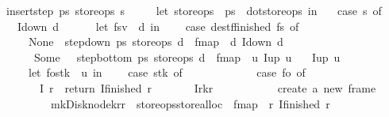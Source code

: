\begin{isabellebody}
{\isachardoublequoteopen}insert{\isacharunderscore}step\ ps{}\ store{\isacharunderscore}ops\ s\ {\isacharequal}\ {\isacharparenleft}\isanewline
\ \ {\isacharparenleft}{\isacharasterisk}\ let\ store{\isacharunderscore}ops\ {\isacharequal}\ ps{}\ {\isacharbar}{\isachargreater}\ dot{\isacharunderscore}store{\isacharunderscore}ops\ in\ {\isacharasterisk}{\isacharparenright}\isanewline
\ \ case\ s\ of\ \isanewline
\ \ I{\isacharunderscore}down\ d\ {\isasymRightarrow}\ {\isacharparenleft}\isanewline
\ \ \ \ let\ {\isacharparenleft}fs{\isacharcomma}v{\isacharparenright}\ {\isacharequal}\ d\ in\isanewline
\ \ \ \ case\ {\isacharparenleft}dest{\isacharunderscore}f{\isacharunderscore}finished\ fs{\isacharparenright}\ of\ \isanewline
\ \ \ \ None\ {\isasymRightarrow}\ {\isacharparenleft}step{\isacharunderscore}down\ ps{}\ store{\isacharunderscore}ops\ d\ {\isacharbar}{\isachargreater}\ fmap\ {\isacharparenleft}{\isacharpercent}\ d{\isachardot}\ I{\isacharunderscore}down\ d{\isacharparenright}{\isacharparenright}\isanewline
\ \ \ \ {\isacharbar}\ Some\ {\isacharunderscore}\ {\isasymRightarrow}\ step{\isacharunderscore}bottom\ ps{}\ store{\isacharunderscore}ops\ d\ {\isacharbar}{\isachargreater}\ fmap\ {\isacharparenleft}{\isacharpercent}\ u{\isachardot}\ I{\isacharunderscore}up\ u{\isacharparenright}{\isacharparenright}\isanewline
\ \ {\isacharbar}\ I{\isacharunderscore}up\ u\ {\isasymRightarrow}\ {\isacharparenleft}\isanewline
\ \ \ \ let\ {\isacharparenleft}fo{\isacharcomma}stk{\isacharparenright}\ {\isacharequal}\ u\ in\isanewline
\ \ \ \ case\ stk\ of\isanewline
\ \ \ \ {\isacharbrackleft}{\isacharbrackright}\ {\isasymRightarrow}\ {\isacharparenleft}\isanewline
\ \ \ \ \ \ case\ fo\ of\ \isanewline
\ \ \ \ \ \ I{}\ r\ {\isasymRightarrow}\ return\ {\isacharparenleft}I{\isacharunderscore}finished\ r{\isacharparenright}\isanewline
\ \ \ \ \ \ {\isacharbar}\ I{}{\isacharparenleft}r{}{\isacharcomma}k{\isacharcomma}r{}{\isacharparenright}\ {\isasymRightarrow}\ {\isacharparenleft}\isanewline
\ \ \ \ \ \ \ \ {\isacharparenleft}{\isacharasterisk}\ create\ a\ new\ frame\ {\isacharasterisk}{\isacharparenright}\isanewline
\ \ \ \ \ \ \ \ {\isacharparenleft}mk{\isacharunderscore}Disk{\isacharunderscore}node{\isacharparenleft}{\isacharbrackleft}k{\isacharbrackright}{\isacharcomma}{\isacharbrackleft}r{}{\isacharcomma}r{}{\isacharbrackright}{\isacharparenright}\ {\isacharbar}{\isachargreater}\ {\isacharparenleft}store{\isacharunderscore}ops{\isacharbar}{\isachargreater}store{\isacharunderscore}alloc{\isacharparenright}\ {\isacharbar}{\isachargreater}\ fmap\ {\isacharparenleft}{\isacharpercent}\ r{\isachardot}\ I{\isacharunderscore}finished\ r{\isacharparenright}{\isacharparenright}{\isacharparenright}{\isacharparenright}\isanewline

\end{isabellebody}
